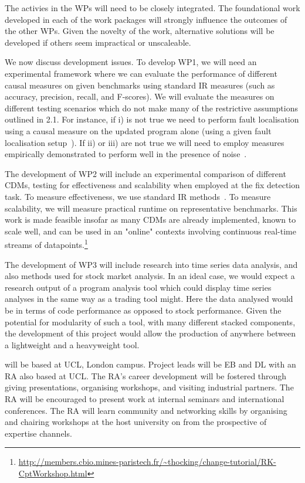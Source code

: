 The activies in the WPs will need to be closely integrated. The foundational work developed in each of the work packages
will strongly influence the outcomes of the other WPs. Given the novelty of the work, alternative solutions will be developed if others seem impractical
or unscaleable. 

We now discuss development issues. To develop WP1, we will need an experimental framework where we can evaluate the performance of different causal measures on given benchmarks using standard IR measures (such as accuracy, precision, recall, and F-scores). We will evaluate the measures on different testing scenarios which do not make many of the restrictive assumptions outlined in 2.1. For instance, if i) is not true we need to perform fault localisation using a causal measure on the updated program alone (using a given fault localisation setup~\cite{eval}). If ii) or iii) are not true we will need to employ measures empirically demonstrated to perform well in the presence of noise~\citep{pearl2016causal}. 

The development of WP2 will include an experimental comparison of different CDMs, testing for effectiveness and scalability when employed at the fix detection task. To measure effectiveness, we use standard IR methods~\citep{Aminikhanghahi, arXiv:1411.7955}. To measure scalability, we will measure practical runtime on representative benchmarks. This work is made feasible insofar as many CDMs are already implemented, known to scale well, and can be used in an "online" contexts involving continuous real-time streams of datapoints.\footnote{\scriptsize{\url{http://members.cbio.mines-paristech.fr/~thocking/change-tutorial/RK-CptWorkshop.html}}} 

The development of WP3 will include research into time series data analysis, and also methods used for stock market analysis. In an ideal case, we would expect a research output of a program analysis tool which could display time series analyses in the same way as a trading tool might. Here the data analysed would be in terms of code performance as opposed to stock performance.  Given the potential for modularity of such a tool, with many different stacked components, the development of this project would allow the production of anywhere between a lightweight and a heavyweight tool.

\project{} will be based at UCL, London campus. Project leads will be EB and DL with an RA also
based at UCL\@. The RA's career development will be fostered through giving presentations,
organising workshops, and visiting industrial partners. The RA will be encouraged to present
work at internal seminars and international conferences. The RA will learn community and networking
skills by organising and chairing workshops at the host university on \project{} from the
prospective of expertise channels. 

